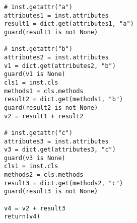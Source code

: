 \begin{lstlisting}[mathescape,basicstyle=\ttfamily]
# inst.getattr("a")
attributes1 = inst.attributes
result1 = dict.get(attributes1, "a")
guard(result1 is not None)

# inst.getattr("b")
attributes2 = inst.attributes
v1 = dict.get(attributes2, "b")
guard(v1 is None)
cls1 = inst.cls
methods1 = cls.methods
result2 = dict.get(methods1, "b")
guard(result2 is not None)
v2 = result1 + result2

# inst.getattr("c")
attributes3 = inst.attributes
v3 = dict.get(attributes3, "c")
guard(v3 is None)
cls1 = inst.cls
methods2 = cls.methods
result3 = dict.get(methods2, "c")
guard(result3 is not None)

v4 = v2 + result3
return(v4)
\end{lstlisting}
